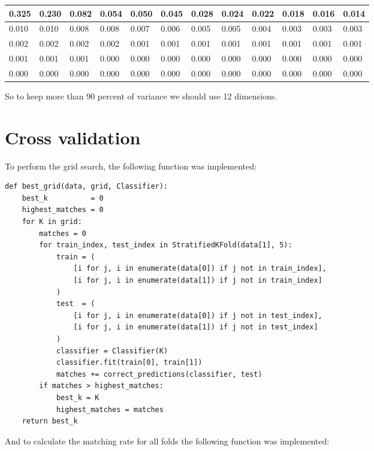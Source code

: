\documentclass{article}
\begin{document}
\begin{table}[h]
    \begin{tabular}{|l|l|l|l|l|l|l|l|l|l|l|l|}
        \hline
            0.325 & 0.230 & 0.082 & 0.054 & 0.050 & 0.045 & 0.028 & 0.024 & 0.022 & 0.018 & 0.016 & 0.014 \\ \hline
            0.010 & 0.010 & 0.008 & 0.008 & 0.007 & 0.006 & 0.005 & 0.005 & 0.004 & 0.003 & 0.003 & 0.003 \\ \hline
            0.002 & 0.002 & 0.002 & 0.002 & 0.001 & 0.001 & 0.001 & 0.001 & 0.001 & 0.001 & 0.001 & 0.001 \\ \hline
            0.001 & 0.001 & 0.001 & 0.000 & 0.000 & 0.000 & 0.000 & 0.000 & 0.000 & 0.000 & 0.000 & 0.000 \\ \hline
            0.000 & 0.000 & 0.000 & 0.000 & 0.000 & 0.000 & 0.000 & 0.000 & 0.000 & 0.000 & 0.000 & 0.000 \\ \hline
    \end{tabular}
\end{table}

So to keep more than 90 percent of variance we should use 12 dimensions.

\newpage

\section{Cross validation}

To perform the grid search, the following function was implemented:

\begin{lstlisting}
def best_grid(data, grid, Classifier):
    best_k          = 0
    highest_matches = 0
    for K in grid:
        matches = 0
        for train_index, test_index in StratifiedKFold(data[1], 5):
            train = (
                [i for j, i in enumerate(data[0]) if j not in train_index],
                [i for j, i in enumerate(data[1]) if j not in train_index]
            )
            test  = (
                [i for j, i in enumerate(data[0]) if j not in test_index],
                [i for j, i in enumerate(data[1]) if j not in test_index]
            )
            classifier = Classifier(K)
            classifier.fit(train[0], train[1])
            matches += correct_predictions(classifier, test)
        if matches > highest_matches:
            best_k = K
            highest_matches = matches
    return best_k
\end{lstlisting}

And to calculate the matching rate for all folds the following function was implemented:
\end{document}
